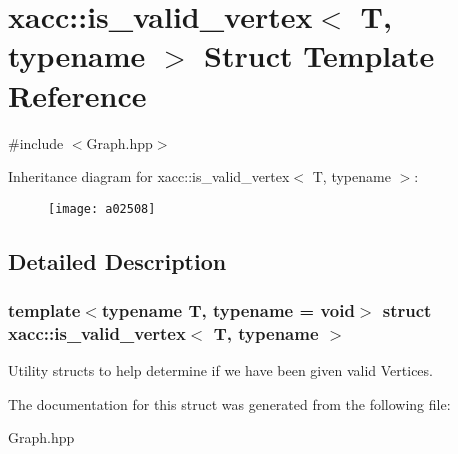 \hypertarget{a02508}{}\section{xacc\+:\+:is\+\_\+valid\+\_\+vertex$<$ T, typename $>$ Struct Template Reference}
\label{a02508}


{\ttfamily \#include $<$Graph.\+hpp$>$}

Inheritance diagram for xacc\+:\+:is\+\_\+valid\+\_\+vertex$<$ T, typename $>$\+:\begin{figure}[H]
\begin{center}
\leavevmode
\texttt{[image: a02508]}
\end{center}
\end{figure}


\subsection{Detailed Description}
\subsubsection*{template$<$typename T, typename = void$>$\newline
struct xacc\+::is\+\_\+valid\+\_\+vertex$<$ T, typename $>$}

Utility structs to help determine if we have been given valid Vertices. 

The documentation for this struct was generated from the following file\+:\begin{DoxyCompactItemize}
\item 
Graph.\+hpp\end{DoxyCompactItemize}

